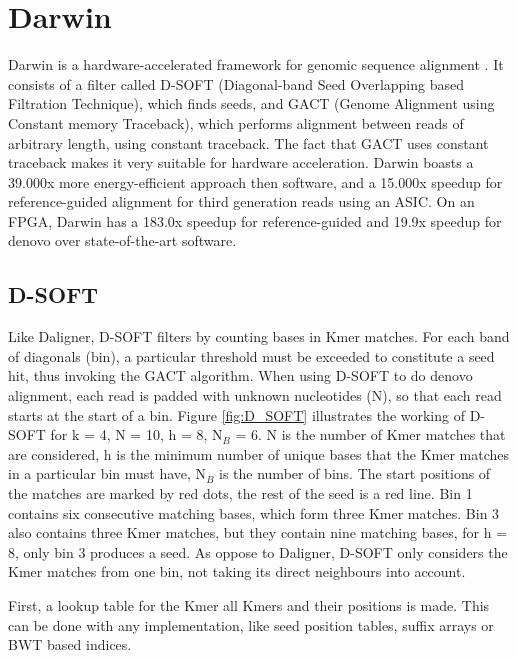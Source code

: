 \documentclass[../main/thesis.tex]{subfiles}
\begin{document}
\section{Darwin}
Darwin is a hardware-accelerated framework for genomic sequence alignment \cite{Darwin1}\cite{Darwin2}.
It consists of a filter called D-SOFT (Diagonal-band Seed Overlapping based Filtration Technique), which finds seeds, and GACT (Genome Alignment using Constant memory Traceback), which performs alignment between reads of arbitrary length, using constant traceback.
The fact that GACT uses constant traceback makes it very suitable for hardware acceleration.
Darwin boasts a 39.000x more energy-efficient approach then software, and a 15.000x speedup for reference-guided alignment for third generation reads using an ASIC.
On an FPGA, Darwin has a 183.0x speedup for reference-guided and 19.9x speedup for denovo over state-of-the-art software.


\subsection{D-SOFT}
Like Daligner, D-SOFT filters by counting bases in Kmer matches.
For each band of diagonals (bin), a particular threshold must be exceeded to constitute a seed hit, thus invoking the GACT algorithm.
When using D-SOFT to do denovo alignment, each read is padded with unknown nucleotides (N), so that each read starts at the start of a bin.
Figure \ref{fig:D_SOFT} illustrates the working of D-SOFT for k = 4, N = 10, h = 8, N$_{B}$ = 6.
N is the number of Kmer matches that are considered, h is the minimum number of unique bases that the Kmer matches in a particular bin must have, N$_{B}$ is the number of bins.
The start positions of the matches are marked by red dots, the rest of the seed is a red line.
Bin 1 contains six consecutive matching bases, which form three Kmer matches.
Bin 3 also contains three Kmer matches, but they contain nine matching bases, for h = 8, only bin 3 produces a seed.
As oppose to Daligner, D-SOFT only considers the Kmer matches from one bin, not taking its direct neighbours into account.


First, a lookup table for the Kmer all Kmers and their positions is made.
This can be done with any implementation, like seed position tables, suffix arrays \cite{SA} or BWT \cite{BWT} based indices.
\end{document}
